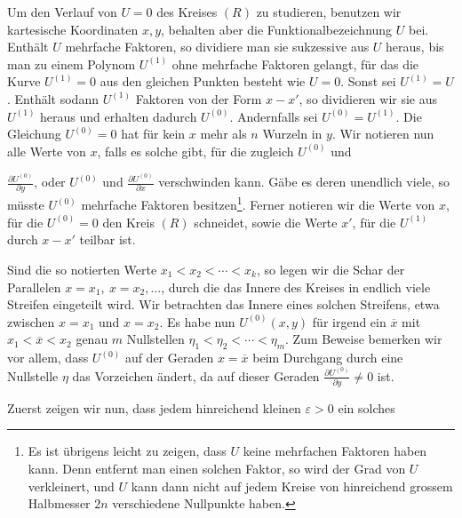 \par\medskip
{} Um den Verlauf von \(U=0\)
 des Kreises \((R)\) zu studieren, benutzen wir kartesische Koordinaten
\(x,y\), behalten aber die Funktionalbezeichnung \(U\) bei. Enthält \(U\) mehrfache
Faktoren, so dividiere man sie sukzessive aus \(U\) heraus, bis man zu
einem Polynom \(U^{(1)}\) ohne mehrfache Faktoren gelangt, für das die Kurve
\(U^{(1)}=0\) aus den gleichen Punkten besteht wie \(U=0\). Sonst sei \(U^{(1)}=U\).
Enthält sodann \(U^{(1)}\) Faktoren von der Form \(x-x'\), so dividieren wir sie aus
\(U^{(1)}\) heraus und erhalten dadurch \(U^{(0)}\). Andernfalls sei \(U^{(0)}=U^{(1)}\). Die
Gleichung \(U^{(0)}=0\) hat für kein \(x\) mehr als \(n\) Wurzeln in \(y\). Wir notieren
nun alle Werte von \(x\), falls es solche gibt, für die zugleich \(U^{(0)}\) und\par
\clearpage{}
\noindent \(\frac{\partial U^{(0)}}{\partial y}\), oder \(U^{(0)}\) und \(\frac{\partial U^{(0)}}{\partial x}\) verschwinden kann. Gäbe es deren unendlich viele,
so müsste \(U^{(0)}\) mehrfache Faktoren besitzen\footnote[2]{Es ist übrigens leicht zu zeigen, dass \(U\) keine mehrfachen Faktoren haben kann. Denn entfernt man einen solchen Faktor, so wird der Grad von \(U\) verkleinert, und \(U\) kann dann nicht auf jedem Kreise von hinreichend grossem Halbmesser \(2n\) verschiedene Nullpunkte haben.}. Ferner notieren wir die Werte
von \(x\), für die \(U^{(0)}=0\) den Kreis \((R)\) schneidet, sowie die Werte \(x'\), für die
\(U^{(1)}\) durch \(x-x'\) teilbar ist.
\par
Sind die so notierten Werte \(x_1<x_2<\cdots<x_k\), so legen wir die Schar
der Parallelen \(x=x_1,\ x=x_2,\ldots\), durch die das Innere des Kreises in endlich
viele Streifen eingeteilt wird. Wir betrachten das Innere eines solchen
Streifens, etwa zwischen \(x=x_1\) und \(x=x_2\). Es habe nun \(U^{(0)}(x,y)\) für irgend
ein \(\overline x\) mit \(x_1<\overline x<x_2\) genau \(m\) Nullstellen \(\eta_1<\eta_2<\cdots<\eta_m\). 
Zum Beweise bemerken wir vor allem, dass \(U^{(0)}\) auf der Geraden
\(x=\overline x\) beim Durchgang durch eine Nullstelle \(\eta\) das Vorzeichen ändert, da
auf dieser Geraden \(\frac{\partial U^{(0)}}{\partial y}\ne0\) ist.
\par
Zuerst zeigen wir nun, dass jedem hinreichend kleinen \(\varepsilon>0\) ein solches
